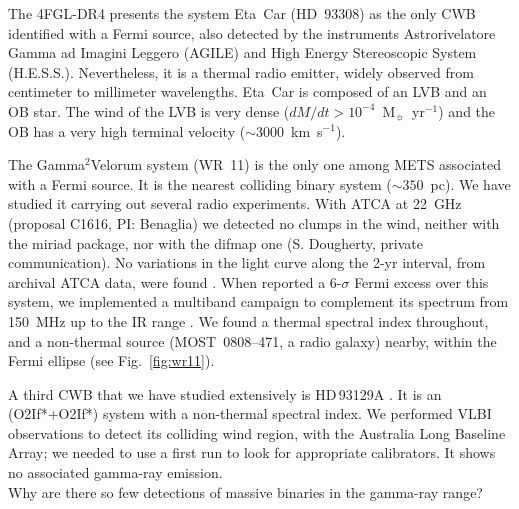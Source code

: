 \documentclass[baaa]{baaa}
\begin{document}
The 4FGL-DR4 presents the system Eta~Car (HD~93308) as the only CWB identified with a Fermi source, also detected by the instruments Astrorivelatore Gamma ad Imagini Leggero (AGILE) and High Energy Stereoscopic System (H.E.S.S.). Nevertheless, it is a thermal radio emitter, widely observed from centimeter to millimeter wavelengths. Eta~Car is composed of an LVB and an OB star. The wind of the LVB is very dense ($dM/dt > 10^{-4}$~M$_{\sun}$~yr$^{-1}$) and the OB has a very high terminal velocity ($\sim 3000$~km~s$^{-1}$). 

The Gamma$^2$Velorum system (WR~11) is the only one among METS associated with a Fermi source. It is the nearest colliding binary system ($\sim 350$~pc). We have studied it carrying out several radio experiments. With ATCA at 22~GHz (proposal C1616, PI: Benaglia) we detected no clumps in the wind, neither with the miriad \citep{sault1995} package, nor with the difmap \citep{shepherd1997} one  (S. Dougherty, private communication). No variations in the light curve along the 2-yr interval, from archival ATCA data, were found \citep{benaglia2016}. When \citet{pshirkov2016} reported a 6-$\sigma$ Fermi excess over this system, we implemented a multiband campaign to complement its spectrum from 150~MHz up to the IR range \citep{benaglia2019}. We found a thermal spectral index throughout, and a non-thermal source (MOST~0808--471, a radio galaxy) nearby, within the Fermi ellipse (see Fig.~\ref{fig:wr11}).

A third CWB that we have studied extensively is HD\,93129A \citep[see][and references therein]{benaglia2015}. It is an (O2If*+O2If*) system with a non-thermal spectral index. We performed VLBI observations to detect its colliding wind region, with the Australia Long Baseline Array; we needed to use a first run to look for appropriate calibrators.  It shows no associated gamma-ray emission.\\

Why are there so few detections of massive binaries in the gamma-ray range?
\end{document}
